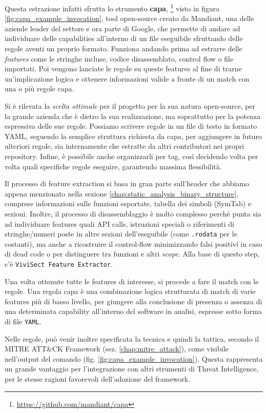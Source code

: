 Questa estrazione infatti sfrutta lo strumento \textbf{capa},
\footnote{\url{https://github.com/mandiant/capa}}
visto in figura \ref{fig:capa_example_invocation},
tool open-source creato da Mandiant, una delle aziende leader del settore e ora parte di Google,
che permette di andare ad individuare delle capabilities all'interno di un file eseguibile
sfruttando delle regole aventi un proprio formato.
Funziona andando prima ad estrarre delle \emph{features} come le stringhe incluse, codice disassemblato, control flow o file importati.
Poi vengono lanciate le regole su queste features al fine di trarne un'implicazione logica e ottenere informazioni valide a fronte di un match con una o più regole capa.

Si è rilevata la \emph{scelta ottimale} per il progetto per la sua natura open-source, per la grande azienda che è dietro la sua realizzazione, ma soprattutto per la potenza espressiva delle sue regole.
Possiamo scrivere regole in un file di testo in formato YAML, seguendo la semplice struttura richiesta da capa, per aggiungere in futuro ulteriori regole, sia internamente che estratte da altri contributori nei propri repository. Infine, è possibile anche organizzarli per tag, così decidendo volta per volta quali specifiche regole eseguire, garantendo massima flessibilità.

Il processo di feature extraction si basa in gran parte sull'header che abbiamo appena menzionato nella sezione \ref{chap:static_analysis_binary_structure}, comprese informazioni sulle funzioni esportate, tabella dei simboli (SymTab) e sezioni. Inoltre, il processo di disassemblaggio è molto complesso perché punta sia ad individuare features quali API calls, istruzioni speciali o riferimenti di stringhe/numeri poste in altre sezioni dell'eseguibile (come \texttt{.rodata} per le costanti), ma anche a ricostruire il control-flow minimizzando falsi positivi in caso di dead code o per distinguere tra funzioni e altri \emph{scope}. Alla base di questo step, c'è \texttt{ViviSect Feature Extractor}. \cite{capa_mandiant_blogpost}

Una volta ottenute tutte le features di interesse, si procede a fare il match con le regole.
Una regola capa è una combinazione logica strutturata di match di varie features più di basso livello, per giungere alla conclusione di presenza o assenza di una determinata capability all'interno del software in analisi, espresse sotto forma di file \texttt{YAML}.

Nelle regole, può venir inoltre specificata la tecnica e quindi la tattica, secondo il MITRE ATT\&CK Framework (sez. \ref{chap:mitre_attack}), come visibile nell'output del comando (fig. \ref{fig:capa_example_invocation}).
Questa rappresenta un grande vantaggio per l'integrazione con altri strumenti di Threat Intelligence, per le stesse ragioni favorevoli dell'adozione del framework.

